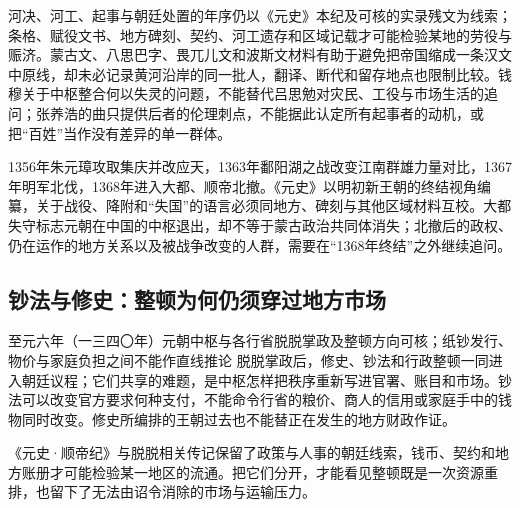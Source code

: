 河决、河工、起事与朝廷处置的年序仍以《元史》本纪及可核的实录残文为线索；条格、赋役文书、地方碑刻、契约、河工遗存和区域记载才可能检验某地的劳役与赈济。蒙古文、八思巴字、畏兀儿文和波斯文材料有助于避免把帝国缩成一条汉文中原线，却未必记录黄河沿岸的同一批人，翻译、断代和留存地点也限制比较。钱穆关于中枢整合何以失灵的问题，不能替代吕思勉对灾民、工役与市场生活的追问；张养浩的曲只提供后者的伦理刺点，不能据此认定所有起事者的动机，或把“百姓”当作没有差异的单一群体。

1356年朱元璋攻取集庆并改应天，1363年鄱阳湖之战改变江南群雄力量对比，1367年明军北伐，1368年进入大都、顺帝北撤。《元史》以明初新王朝的终结视角编纂，关于战役、降附和“失国”的语言必须同地方、碑刻与其他区域材料互校。大都失守标志元朝在中国的中枢退出，却不等于蒙古政治共同体消失；北撤后的政权、仍在运作的地方关系以及被战争改变的人群，需要在“1368年终结”之外继续追问。

\subsection{钞法与修史：整顿为何仍须穿过地方市场}
\begin{event}{}{至元六年（一三四〇年）}{元朝中枢与各行省}{脱脱掌政及整顿方向可核；纸钞发行、物价与家庭负担之间不能作直线推论}
脱脱掌政后，修史、钞法和行政整顿一同进入朝廷议程；它们共享的难题，是中枢怎样把秩序重新写进官署、账目和市场。钞法可以改变官方要求何种支付，不能命令行省的粮价、商人的信用或家庭手中的钱物同时改变。修史所编排的王朝过去也不能替正在发生的地方财政作证。

《元史·顺帝纪》与脱脱相关传记保留了政策与人事的朝廷线索，钱币、契约和地方账册才可能检验某一地区的流通。把它们分开，才能看见整顿既是一次资源重排，也留下了无法由诏令消除的市场与运输压力。
\end{event}